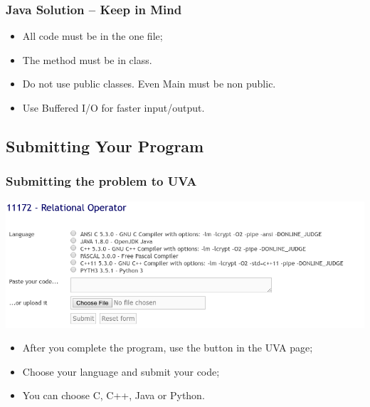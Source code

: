 \documentclass{beamer}
\begin{document}
\begin{frame}
  \frametitle{Java Solution -- Keep in Mind}

  \begin{itemize}
  \item All code must be in the one file;

    \medskip

  \item The  method must be in  class.

    \medskip

  \item Do not use public classes. Even Main must be non public.

    \medskip

  \item Use Buffered I/O for faster input/output.
  \end{itemize}
\end{frame}

\subsection{Submitting Your Program}

\begin{frame}
  \frametitle{Submitting the problem to UVA}
  \begin{center}
    \includegraphics[width=1.1\textwidth]{../img/submitpage}
  \end{center}

  \begin{itemize}
    \item After you complete the program, use the  button in the UVA page;
    \item Choose your language and submit your code;
    \item You can choose C, C++, Java or Python.
  \end{itemize}
\end{frame}
\end{document}
